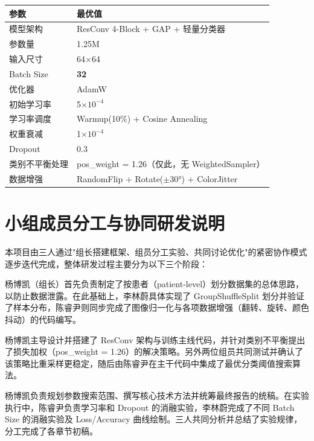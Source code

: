 \documentclass[12pt,a4paper]{ctexart}
\begin{document}
\begin{table}[H]
\centering
\begin{tabular}{ll}
\toprule
参数 & 最优值 \\
\midrule
模型架构 & ResConv 4-Block + GAP + 轻量分类器 \\
参数量 & 1.25M \\
输入尺寸 & 64$\times$64 \\
Batch Size & \textbf{32} \\
优化器 & AdamW \\
初始学习率 & 5$\times10^{-4}$ \\
学习率调度 & Warmup(10\%) + Cosine Annealing \\
权重衰减 & 1$\times10^{-4}$ \\
Dropout & 0.3 \\
类别不平衡处理 & pos\_weight = 1.26（仅此，无 WeightedSampler） \\
数据增强 & RandomFlip + Rotate($\pm$30°) + ColorJitter \\
\bottomrule
\end{tabular}
\end{table}

\appendix
{}
\section{小组成员分工与协同研发说明}

本项目由三人通过"组长搭建框架、组员分工实验、共同讨论优化"的紧密协作模式逐步迭代完成，整体研发过程主要分为以下三个阶段：

杨博凯（组长）首先负责制定了按患者（patient-level）划分数据集的总体思路，以防止数据泄露。在此基础上，李林蔚具体实现了 GroupShuffleSplit 划分并验证了样本分布，陈睿尹则同步完成了图像归一化与各项数据增强（翻转、旋转、颜色抖动）的代码编写。

杨博凯主导设计并搭建了 ResConv 架构与训练主线代码，并针对类别不平衡提出了损失加权（pos\_weight = 1.26）的解决策略。另外两位组员共同测试并确认了该策略比重采样更稳定，随后由陈睿尹在主干代码中集成了最优分类阈值搜索算法。

杨博凯负责规划参数搜索范围、撰写核心技术方法并统筹最终报告的统稿。在实验执行中，陈睿尹负责学习率和 Dropout 的消融实验，李林蔚完成了不同 Batch Size 的消融实验及 Loss/Accuracy 曲线绘制。三人共同分析并总结了实验规律，分工完成了各章节初稿。
\end{document}
